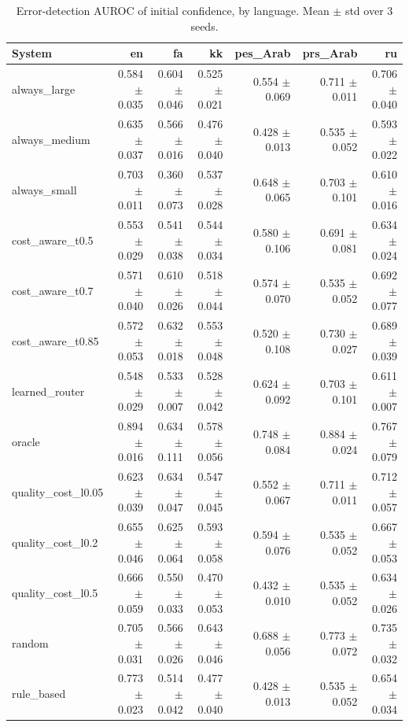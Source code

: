 \begin{table}[t]
\centering
\small
\caption{Error-detection AUROC of initial confidence, by language. Mean $\pm$ std over 3 seeds.}
\label{tab:language_reliability}
\begin{tabular}{lrrrrrr}
\toprule
System & en & fa & kk & pes\_Arab & prs\_Arab & ru \\
\midrule
always\_large & 0.584 $\pm$ 0.035 & 0.604 $\pm$ 0.046 & 0.525 $\pm$ 0.021 & 0.554 $\pm$ 0.069 & 0.711 $\pm$ 0.011 & 0.706 $\pm$ 0.040 \\
always\_medium & 0.635 $\pm$ 0.037 & 0.566 $\pm$ 0.016 & 0.476 $\pm$ 0.040 & 0.428 $\pm$ 0.013 & 0.535 $\pm$ 0.052 & 0.593 $\pm$ 0.022 \\
always\_small & 0.703 $\pm$ 0.011 & 0.360 $\pm$ 0.073 & 0.537 $\pm$ 0.028 & 0.648 $\pm$ 0.065 & 0.703 $\pm$ 0.101 & 0.610 $\pm$ 0.016 \\
cost\_aware\_t0.5 & 0.553 $\pm$ 0.029 & 0.541 $\pm$ 0.038 & 0.544 $\pm$ 0.034 & 0.580 $\pm$ 0.106 & 0.691 $\pm$ 0.081 & 0.634 $\pm$ 0.024 \\
cost\_aware\_t0.7 & 0.571 $\pm$ 0.040 & 0.610 $\pm$ 0.026 & 0.518 $\pm$ 0.044 & 0.574 $\pm$ 0.070 & 0.535 $\pm$ 0.052 & 0.692 $\pm$ 0.077 \\
cost\_aware\_t0.85 & 0.572 $\pm$ 0.053 & 0.632 $\pm$ 0.018 & 0.553 $\pm$ 0.048 & 0.520 $\pm$ 0.108 & 0.730 $\pm$ 0.027 & 0.689 $\pm$ 0.039 \\
learned\_router & 0.548 $\pm$ 0.029 & 0.533 $\pm$ 0.007 & 0.528 $\pm$ 0.042 & 0.624 $\pm$ 0.092 & 0.703 $\pm$ 0.101 & 0.611 $\pm$ 0.007 \\
oracle & 0.894 $\pm$ 0.016 & 0.634 $\pm$ 0.111 & 0.578 $\pm$ 0.056 & 0.748 $\pm$ 0.084 & 0.884 $\pm$ 0.024 & 0.767 $\pm$ 0.079 \\
quality\_cost\_l0.05 & 0.623 $\pm$ 0.039 & 0.634 $\pm$ 0.047 & 0.547 $\pm$ 0.045 & 0.552 $\pm$ 0.067 & 0.711 $\pm$ 0.011 & 0.712 $\pm$ 0.057 \\
quality\_cost\_l0.2 & 0.655 $\pm$ 0.046 & 0.625 $\pm$ 0.064 & 0.593 $\pm$ 0.058 & 0.594 $\pm$ 0.076 & 0.535 $\pm$ 0.052 & 0.667 $\pm$ 0.053 \\
quality\_cost\_l0.5 & 0.666 $\pm$ 0.059 & 0.550 $\pm$ 0.033 & 0.470 $\pm$ 0.053 & 0.432 $\pm$ 0.010 & 0.535 $\pm$ 0.052 & 0.634 $\pm$ 0.026 \\
random & 0.705 $\pm$ 0.031 & 0.566 $\pm$ 0.026 & 0.643 $\pm$ 0.046 & 0.688 $\pm$ 0.056 & 0.773 $\pm$ 0.072 & 0.735 $\pm$ 0.032 \\
rule\_based & 0.773 $\pm$ 0.023 & 0.514 $\pm$ 0.042 & 0.477 $\pm$ 0.040 & 0.428 $\pm$ 0.013 & 0.535 $\pm$ 0.052 & 0.654 $\pm$ 0.034 \\

\end{tabular}
\end{table}
